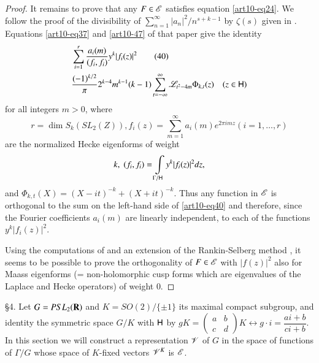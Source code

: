 \begin{proof}
It remains to prove that any $F \in \mathscr{E}$ satisfies equation \eqref{art10-eq24}. We follow the proof of the divisibility of $\sum\limits^\infty_{n=1} |a_n|^2 / n^{s+k-1}$ by $\zeta(s)$ given in \cite{art10-11}. Equations \eqref{art10-eq37} and \eqref{art10-47} of that paper give the identity
\begin{align*}
&\sum\limits^r_{i=1} \frac{a_i(m)}{(f_i, f_i)} y^k |f_i (z)|^2 \tag{40} \label{art10-40}\\
& \frac{(-1)^{k/2}}{\pi} 2^{k-4} m^{k-1} (k-1) \sum\limits^\infty_{t = - \infty} \mathscr{L}_{t^2 - 4 m} \Phi_{k,t} (z) \quad (z \in \mathsf{H})
\end{align*}
for all integers $m > 0$, where 
$$
r = \dim S_k (SL_2 (Z)), f_i(z)  =\sum\limits^\infty_{m=1} a_i (m) e^{2 \pi i m z} (i = 1, \ldots, r)
$$ 
are the normalized Hecke eigenforms of weight 
$$
k,\;(f_i, f_i) = \int\limits_{\Gamma / \mathsf{H}} y^k |f_i(z)|^2 dz,
$$ 
and $\Phi_{k,t} (X) = (X - it)^{-k} + (X + it)^{-k}$. Thus any function in $\mathscr{E}$ is orthogonal to the sum on the left-hand side of \eqref{art10-eq40} and therefore, since the Fourier coefficients $a_i(m)$ are linearly independent, to each of the functions $y^k |f_i(z)|^2$.

Using the computations of \cite{art10-12} and an extension of the Rankin-Selberg method \cite{art10-13} , it seems to be possible to prove the orthogonality of $F \in \mathscr{E}$ with $|f(z)|^2$ also for Maass eigenforms (= non-holomorphic cusp forms which are eigenvalues of the Laplace and Hecke operators) of weight 0.
\end{proof}

\S 4. Let $G = PSL_2 (\mathbf{R})$ and $K = SO (2) / \{\pm 1\}$ its maximal compact subgroup, and identity the symmetric space $G/ K$ with $\mathsf{H}$ by $gK = \left(\begin{matrix}
a & b \\
 c & d
\end{matrix}\right)K \leftrightarrow g \cdot i = \dfrac{ai + b}{ci+b}$. In this section we will construct a representation $\mathscr{V}$ of $G$ in the space of functions of $\Gamma / G$ whose space of $K$-fixed vectors $\mathscr{V}^K$ is $\mathscr{E}$.

